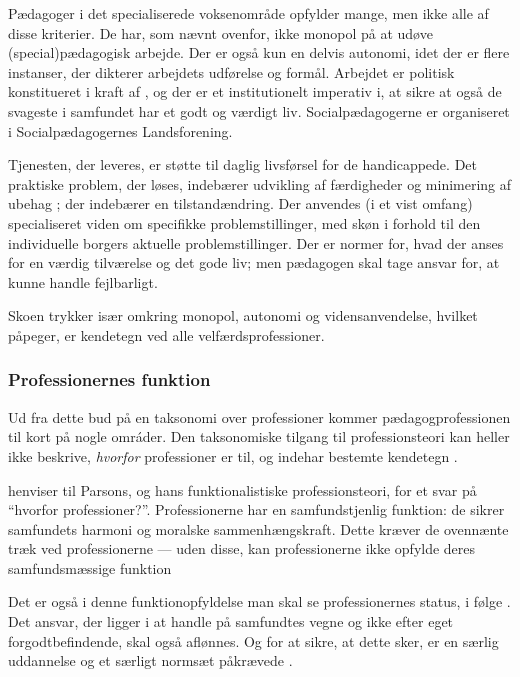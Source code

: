 Pædagoger i det specialiserede voksenområde opfylder mange, men ikke alle af disse kriterier.
De har, som nævnt ovenfor, ikke monopol på at udøve (special)pædagogisk arbejde.
Der er også kun en delvis autonomi, idet der er flere instanser, der dikterer arbejdets udførelse og formål. 
Arbejdet er politisk konstitueret i kraft af \autocite{social-ogindenrigsministerietBekendtgorelseAfLov2019}, og der er et institutionelt imperativ i, at sikre at også de svageste i samfundet har et godt og værdigt liv.
Socialpædagogerne er organiseret i Socialpædagogernes Landsforening.

Tjenesten, der leveres, er støtte til daglig livsførsel for de handicappede.
Det praktiske problem, der løses, indebærer udvikling af færdigheder og minimering af ubehag ; der indebærer en tilstandændring.
Der anvendes (i et vist omfang) specialiseret viden om specifikke problemstillinger, med skøn i forhold til den individuelle borgers aktuelle problemstillinger.
Der er normer for, hvad der anses for en værdig tilværelse og det gode liv; men pædagogen skal tage ansvar for, at kunne handle fejlbarligt.

Skoen trykker især omkring monopol, autonomi og vidensanvendelse, hvilket \citeauthor{frederiksenVelfaerdsprofessionerMellemOmsorg2017} påpeger, er kendetegn ved alle velfærdsprofessioner.

\subsubsection{Professionernes funktion}
Ud fra dette bud på en taksonomi over professioner kommer pædagogprofessionen til kort på nogle omráder.
Den taksonomiske tilgang til professionsteori kan heller ikke beskrive, \textit{hvorfor} professioner er til, og indehar bestemte kendetegn \autocite[s. 450]{frederiksenVelfaerdsprofessionerMellemOmsorg2017}.

\citeauthor{frederiksenVelfaerdsprofessionerMellemOmsorg2017} henviser til Parsons, og hans funktionalistiske professionsteori, for et svar på “hvorfor professioner?”.
Professionerne har en samfundstjenlig funktion: de sikrer samfundets harmoni og moralske sammenhængskraft.
Dette kræver de ovennænte træk ved professionerne --- uden disse, kan professionerne ikke opfylde deres samfundsmæssige funktion \autocite[s. 450]{frederiksenVelfaerdsprofessionerMellemOmsorg2017}

Det er også i denne funktionopfyldelse man skal se professionernes status, i følge \citeauthor{frederiksenVelfaerdsprofessionerMellemOmsorg2017}.
Det ansvar, der ligger i at handle på samfundtes vegne og ikke efter eget forgodtbefindende, skal også aflønnes.
Og for at sikre, at dette sker, er en særlig uddannelse og et særligt normsæt påkrævede \autocite[s. 451]{frederiksenVelfaerdsprofessionerMellemOmsorg2017}.

